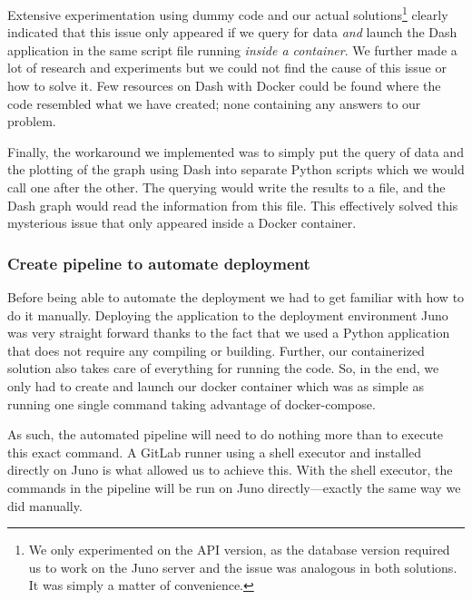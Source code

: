 Extensive experimentation using dummy code and our actual
solutions\footnote{We only experimented on the API version, as the
	database version required us to work on the Juno server and the
	issue was analogous in both solutions. It was simply a matter of
convenience.} clearly indicated that this issue only appeared if we
query for data \emph{and} launch the Dash application in the same
script file running \emph{inside a container}. We further made a lot
of research and experiments but we could not find the cause of this
issue or how to solve it. Few resources on Dash with Docker could be
found where the code resembled what we have created; none containing
any answers to our problem.

Finally, the workaround we implemented was to simply put the query of
data and the plotting of the graph using Dash into separate Python
scripts which we would call one after the other. The querying would
write the results to a file, and the Dash graph would read the
information from this file. This effectively solved this mysterious
issue that only appeared inside a Docker container.

\subsubsection{Create pipeline to automate deployment}

Before being able to automate the deployment we had to get familiar
with how to do it manually. Deploying the application to the
deployment environment Juno was very
straight forward thanks to the fact that we used a Python application
that does not require any compiling or building. Further, our
containerized solution also takes care of everything for running the
code. So, in the end, we only had to create and launch our docker
container which was as simple as running one single command taking
advantage of docker-compose.

As such, the automated pipeline will need to do nothing more than to
execute this exact command.
A GitLab runner using a shell executor and installed 
directly on Juno is what allowed us to achieve this. With the shell
executor, the commands in
the pipeline will be run on Juno directly---exactly the same way
we did manually.

